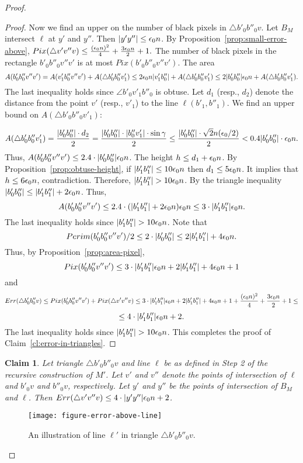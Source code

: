 \documentclass[11pt,english]{article}
\newtheorem{claim}[theorem]{Claim}
\numberwithin{figure}{section}
\begin{document}
\begin{proof}
{\begin{proof}
Now we find an upper on the number of black pixels in $\bigtriangleup b'_0b''_0v$. Let $B_M$ intersect $\ell$ at $y'$ and $y''$. Then $|y'y''|\leq {\epsilon_0} n$. By Proposition~\ref{prop:small-error-above}, $Pix(\bigtriangleup v'v''v)\leq\frac{({\epsilon_0} n)^2}4+\frac{3{\epsilon_0} n}2+1.$ The number of black pixels in the rectangle $b'_0b''_0v''v'$ is at most $Pix(b'_0b''_0v''v')$. The area
$$A(b'_0b''_0v''v')=A(v'_1b''_0v''v')+A(\bigtriangleup b'_0b''_0v'_1)\leq 2{\epsilon_0} n|v'_1b''_0|+A(\bigtriangleup b'_0b''_0v'_1)\leq2|b'_0b''_0|{\epsilon_0} n+A(\bigtriangleup b'_0b''_0v'_1).$$
The last inequality holds since $\angle b'_0v'_1b''_0$ is obtuse. Let $d_1$ (resp., $d_2$) denote the distance from the point $v'$ (resp., $v'_1$) to the line $\ell(b'_1,b''_1)$. We find an upper bound on $A(\bigtriangleup b'_0b''_0v'_1)$:

$$A(\bigtriangleup b'_0b''_0v'_1)=\frac{|b'_0b''_0|\cdot d_2}{2}=\frac{|b'_0b''_0|\cdot|b''_0v'_1|\cdot\sin{\gamma}}{2}\leq \frac{|b'_0b''_0|\cdot \sqrt{2}n({\epsilon_0}/2)}{2}<0.4|b'_0b''_0|\cdot{\epsilon_0} n.$$ Thus, $A(b'_0b''_0v''v')\leq 2.4\cdot|b'_0b''_0|{\epsilon_0} n$. The height $h\leq d_1+{\epsilon_0} n$. By Proposition~\ref{prop:obtuse-height}, if $|b'_1b''_1|\leq10{\epsilon_0} n$ then $d_1\leq5{\epsilon_0} n$. It implies that $h\leq6{\epsilon_0} n$, contradiction. Therefore, $|b'_1b''_1|>10\bigdelta n$. By the triangle inequality $|b'_0b''_0|\leq |b'_1b''_1|+2{\epsilon_0} n$. Thus,
$$A(b'_0b''_0v''v')\leq 2.4\cdot(|b'_1b''_1|+2{\epsilon_0} n){\epsilon_0} n\leq 3\cdot|b'_1b''_1|{\epsilon_0} n.$$ The last inequality holds since $|b'_1b''_1|>10\bigdelta n$. Note that $$Perim(b'_0b''_0v''v')/2\leq 2\cdot|b'_0b''_0|\leq 2|b'_1b''_1|+4{\epsilon_0} n.$$ Thus, by Proposition~\ref{prop:area-pixel}, $$Pix(b'_0b''_0v''v')\leq 3\cdot|b'_1b''_1|{\epsilon_0} n+2|b'_1b''_1|+4{\epsilon_0} n+1$$
and $$Err(\bigtriangleup b'_0b''_0v)\leq Pix(b'_0b''_0v''v')+Pix(\bigtriangleup v'v''v)\leq 3\cdot|b'_1b''_1|{\epsilon_0} n+2|b'_1b''_1|+4{\epsilon_0} n+1+\frac{({\epsilon_0} n)^2}4+\frac{3{\epsilon_0} n}2+1\leq$$ $$\leq4\cdot|b'_1b''_1|{\epsilon_0} n+2.$$
The last inequality holds since $|b'_1b''_1|>10\bigdelta n$. This completes the proof of Claim~\ref{cl:error-in-triangles}.
\end{proof}
\begin{claim}
\label{cl:small-area-above-line}
Let triangle $\bigtriangleup b'_0b''_0v$ and line $\ell$ be as defined in Step 2 of the recursive construction of $M'$. Let $v'$ and $v''$ denote the points of intersection of $\ell$ and $b'_0v$ and $b''_0v$, respectively. Let $y'$ and $y''$ be the points of intersection of $B_M$ and $\ell$. Then $Err(\bigtriangleup v'v''v)\leq 4\cdot|y'y''|{\epsilon_0} n+2$.
\end{claim}
\begin{figure}[ht]
\centering
\texttt{[image: figure-error-above-line]}
\caption{ An illustration of line $\ell'$ in triangle $\bigtriangleup b'_0b''_0v$.}
\label{fig:error-above-l}
\end{figure}

}
\end{proof}
\end{document}
